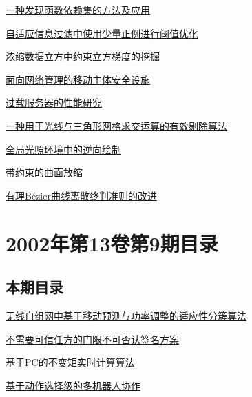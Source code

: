 \documentclass[a4paper]{article}
\begin{document}
\href{http://www.jos.org.cn/ch/reader/download_pdf.aspx?file_no=20031004&year_id=2003&quarter_id=10&falg=1}{一种发现函数依赖集的方法及应用}

\href{http://www.jos.org.cn/ch/reader/download_pdf.aspx?file_no=20031005&year_id=2003&quarter_id=10&falg=1}{自适应信息过滤中使用少量正例进行阈值优化}

\href{http://www.jos.org.cn/ch/reader/download_pdf.aspx?file_no=20031006&year_id=2003&quarter_id=10&falg=1}{浓缩数据立方中约束立方梯度的挖掘}

\href{http://www.jos.org.cn/ch/reader/download_pdf.aspx?file_no=20031011&year_id=2003&quarter_id=10&falg=1}{面向网络管理的移动主体安全设施}

\href{http://www.jos.org.cn/ch/reader/download_pdf.aspx?file_no=20031013&year_id=2003&quarter_id=10&falg=1}{过载服务器的性能研究}

\href{http://www.jos.org.cn/ch/reader/download_pdf.aspx?file_no=20031014&year_id=2003&quarter_id=10&falg=1}{一种用于光线与三角形网格求交运算的有效剔除算法}

\href{http://www.jos.org.cn/ch/reader/download_pdf.aspx?file_no=20031015&year_id=2003&quarter_id=10&falg=1}{全局光照环境中的逆向绘制}

\href{http://www.jos.org.cn/ch/reader/download_pdf.aspx?file_no=20031016&year_id=2003&quarter_id=10&falg=1}{带约束的曲面放缩}

\href{http://www.jos.org.cn/ch/reader/download_pdf.aspx?file_no=20031017&year_id=2003&quarter_id=10&falg=1}{有理Bézier曲线离散终判准则的改进}


\section{\textbf{2002年第13卷第9期目录}}
\subsection{本期目录}
\href{http://www.jos.org.cn/ch/reader/download_pdf.aspx?file_no=20020901&year_id=2002&quarter_id=9&falg=1}{无线自组网中基于移动预测与功率调整的适应性分簇算法}

\href{http://www.jos.org.cn/ch/reader/download_pdf.aspx?file_no=20020902&year_id=2002&quarter_id=9&falg=1}{不需要可信任方的门限不可否认签名方案}

\href{http://www.jos.org.cn/ch/reader/download_pdf.aspx?file_no=20020903&year_id=2002&quarter_id=9&falg=1}{基于PC的不变矩实时计算算法}

\href{http://www.jos.org.cn/ch/reader/download_pdf.aspx?file_no=20020904&year_id=2002&quarter_id=9&falg=1}{基于动作选择级的多机器人协作}
\end{document}
